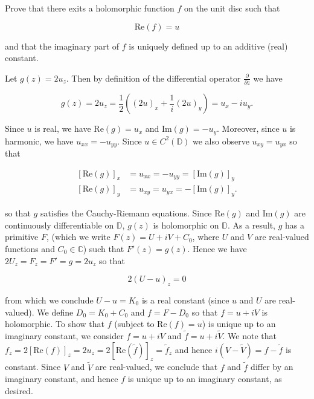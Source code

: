 Prove that there exits a holomorphic function $f$ on the unit disc such that

$$
\text{Re} (f) = u
$$

and that the imaginary part of $f$ is uniquely defined up to an additive (real) constant.

\begin{solution}
    Let $g(z) = 2 u_z$. Then by definition of the differential operator $\frac{\partial}{\partial z}$ we have

    $$
    g(z) = 2 u_z = \frac{1}{2} \left((2u)_x + \frac{1}{i} (2u)_y \right) = u_x - i u_y.
    $$

    Since $u$ is real, we have $\text{Re}(g) = u_x$ and $\text{Im}(g) = -u_y$. Moreover, since $u$ is harmonic, we have
    $u_{xx} = -u_{yy}$. Since $u \in C^2(\mathbb{D})$ we also observe $u_{xy} = u_{yx}$ so that

    \begin{align*}
        \left[\text{Re}(g) \right]_x &= u_{xx} = -u_{yy} = \left[\text{Im}(g) \right]_y \\
        \left[\text{Re}(g) \right]_y &= u_{xy} = u_{yx} = - \left[\text{Im}(g) \right]_y.
    \end{align*}
    
    so that $g$ satisfies the Cauchy-Riemann equations. Since $\text{Re}(g)$ and $\text{Im}(g)$ are continuously 
    differentiable on $\mathbb{D}$, $g(z)$ is holomorphic on $\mathbb{D}$. As a result, $g$ has a primitive $F$, 
    (which we write $F(z) = U + i V + C_0$, where $U$ and $V$ are real-valued functions and $C_0 \in \mathbb{C}$) such
    that $F'(z) = g(z)$. Hence we have $2 U_z = F_z = F' = g = 2 u_z$ so that

    $$
    2 \left(U - u \right)_z = 0
    $$

    from which we conclude $U - u = K_0$ is a real constant (since $u$ and $U$ are real-valued). We define 
    $D_0 = K_0 + C_0$ and $f = F - D_0$ so that $f = u + i V$ is holomorphic. To show that $f$ 
    (subject to $\text{Re}(f) = u$) is unique up to an imaginary constant, we consider $f = u + i V$ and 
    $\tilde{f} = u + i \tilde{V}$. We note that 
    $f_z = 2 \left[ \text{Re}(f) \right]_z = 2u_z = 2 \left[ \text{Re}(\tilde{f}) \right]_z = \tilde{f}_z$ and hence
    $i (V - \tilde{V}) = f - \tilde{f}$ is constant. Since $V$ and $\tilde{V}$ are real-valued, we conclude that $f$ and
    $\tilde{f}$ differ by an imaginary constant, and hence $f$ is unique up to an imaginary constant, as desired.
    \ \\
\end{solution}